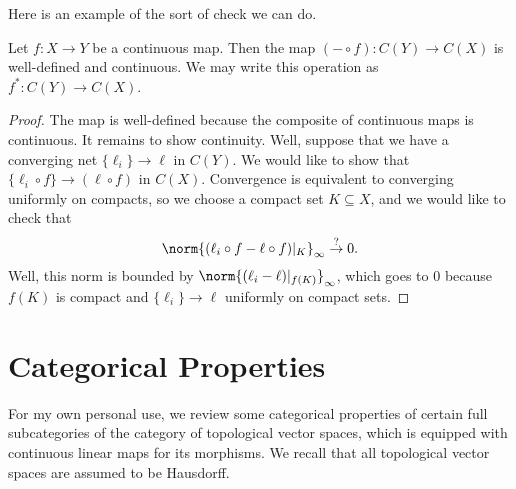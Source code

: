 \documentclass[notes.tex]{subfiles}
\begin{document}
Here is an example of the sort of check we can do.
\begin{example} \label{ex:pushforward-cont}
	Let $f\colon X\to Y$ be a continuous map. Then the map $(-\circ f)\colon C(Y)\to C(X)$ is well-defined and continuous.
	We may write this operation as $f^*\colon C(Y)\to C(X)$.
\end{example}
\begin{proof}
	The map is well-defined because the composite of continuous maps is continuous. It remains to show continuity. Well, suppose that we have a converging net $\{\ell_i\}\to\ell$ in $C(Y)$. We would like to show that $\{\ell_i\circ f\}\to(\ell\circ f)$ in $C(X)$. Convergence is equivalent to converging uniformly on compacts, so we choose a compact set $K\subseteq X$, and we would like to check that
	\[\norm{(\ell_i\circ f-\ell\circ f)|_K}_\infty\stackrel?\to0.\]
	Well, this norm is bounded by $\norm{(\ell_i-\ell)|_{f(K)}}_\infty$, which goes to $0$ because $f(K)$ is compact and $\{\ell_i\}\to\ell$ uniformly on compact sets.
\end{proof}

\section{Categorical Properties}
For my own personal use, we review some categorical properties of certain full subcategories of the category of topological vector spaces, which is equipped with continuous linear maps for its morphisms. We recall that all topological vector spaces are assumed to be Hausdorff.
\end{document}
